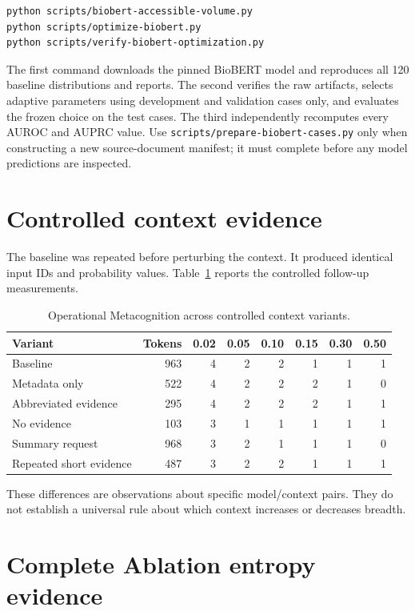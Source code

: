 \documentclass[11pt,a4paper]{article}
\begin{document}
\begin{lstlisting}
python scripts/biobert-accessible-volume.py
python scripts/optimize-biobert.py
python scripts/verify-biobert-optimization.py
\end{lstlisting}

The first command downloads the pinned BioBERT model and reproduces all 120 baseline distributions and reports. The second verifies the raw artifacts, selects adaptive parameters using development and validation cases only, and evaluates the frozen choice on the test cases. The third independently recomputes every AUROC and AUPRC value. Use \texttt{scripts/prepare-biobert-cases.py} only when constructing a new source-document manifest; it must complete before any model predictions are inspected.

\section{Controlled context evidence}
The baseline was repeated before perturbing the context. It produced identical input IDs and probability values. Table~\ref{tab:context-proof} reports the controlled follow-up measurements.

{\scriptsize
\begin{table}[h]
\centering
\caption{Operational Metacognition across controlled context variants.}
\label{tab:context-proof}
\setlength{\tabcolsep}{4pt}
\begin{tabular}{lrrrrrrr}
\toprule
Variant & Tokens & 0.02 & 0.05 & 0.10 & 0.15 & 0.30 & 0.50 \\
\midrule
Baseline & 963 & 4 & 2 & 2 & 1 & 1 & 1 \\
Metadata only & 522 & 4 & 2 & 2 & 2 & 1 & 0 \\
Abbreviated evidence & 295 & 4 & 2 & 2 & 2 & 1 & 1 \\
No evidence & 103 & 3 & 1 & 1 & 1 & 1 & 1 \\
Summary request & 968 & 3 & 2 & 1 & 1 & 1 & 0 \\
Repeated short evidence & 487 & 3 & 2 & 2 & 1 & 1 & 1 \\
\bottomrule
\end{tabular}
\end{table}
}

These differences are observations about specific model/context pairs. They do not establish a universal rule about which context increases or decreases breadth.

\section{Complete Ablation entropy evidence}

\end{document}
